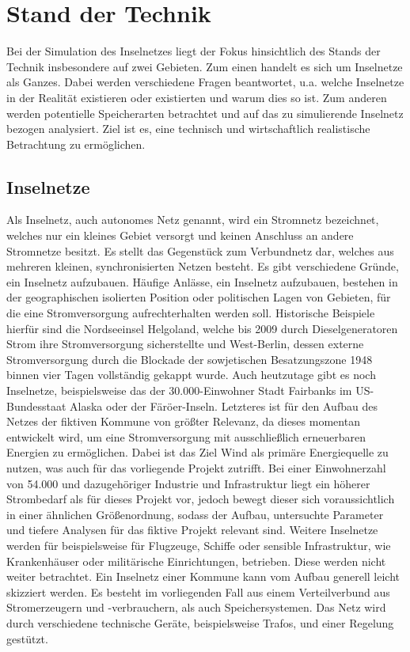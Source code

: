 \chapter{Stand der Technik}

Bei der Simulation des Inselnetzes liegt der Fokus hinsichtlich des Stands der Technik insbesondere auf zwei Gebieten. Zum einen handelt es sich um Inselnetze als Ganzes. Dabei werden verschiedene Fragen beantwortet, u.a. welche Inselnetze in der Realität existieren oder existierten und warum dies so ist. Zum anderen werden potentielle Speicherarten betrachtet und auf das zu simulierende Inselnetz bezogen analysiert. Ziel ist es, eine technisch und wirtschaftlich realistische Betrachtung zu ermöglichen.

\section{Inselnetze}

Als Inselnetz, auch autonomes Netz genannt, wird ein Stromnetz bezeichnet, welches nur ein kleines Gebiet versorgt und keinen Anschluss an andere Stromnetze besitzt. 
Es stellt das Gegenstück zum Verbundnetz dar, welches aus mehreren kleinen, synchronisierten Netzen besteht\cite{energielexikon}. 
Es gibt verschiedene Gründe, ein Inselnetz aufzubauen. Häufige Anlässe, ein Inselnetz aufzubauen, bestehen in der geographischen isolierten Position
oder politischen Lagen von Gebieten, für die eine Stromversorgung aufrechterhalten werden soll. 
Historische Beispiele hierfür sind die Nordseeinsel Helgoland, welche bis 2009 durch Dieselgeneratoren Strom ihre Stromversorgung sicherstellte\cite{merkur} und West-Berlin, 
dessen externe Stromversorgung durch die Blockade der sowjetischen Besatzungszone 1948 binnen vier Tagen vollständig gekappt wurde\cite{berlinstreet}. 
Auch heutzutage gibt es noch Inselnetze, beispielsweise das der 30.000-Einwohner Stadt Fairbanks im US-Bundesstaat Alaska\cite{iseralaska} oder 
der Färöer-Inseln\cite{cigre-article}. 
Letzteres ist für den Aufbau des Netzes der fiktiven Kommune von größter Relevanz, da dieses momentan entwickelt wird, 
um eine Stromversorgung mit ausschließlich erneuerbaren Energien zu ermöglichen\cite{trondheim-thesis}. 
Dabei ist das Ziel Wind als primäre Energiequelle zu nutzen, was auch für das vorliegende Projekt zutrifft. Bei einer Einwohnerzahl von 54.000\cite{statista-population} und dazugehöriger Industrie und Infrastruktur liegt ein höherer Strombedarf als für dieses Projekt vor, jedoch bewegt dieser sich voraussichtlich in einer ähnlichen Größenordnung, sodass der Aufbau, untersuchte Parameter und tiefere Analysen für das fiktive Projekt relevant sind.
Weitere Inselnetze werden für beispielsweise für Flugzeuge, Schiffe oder sensible Infrastruktur, wie Krankenhäuser oder militärische Einrichtungen, betrieben. 
Diese werden nicht weiter betrachtet.
Ein Inselnetz einer Kommune kann vom Aufbau generell leicht skizziert werden. 
Es besteht im vorliegenden Fall aus einem Verteilverbund  aus Stromerzeugern und -verbrauchern, als auch Speichersystemen. 
Das Netz wird durch verschiedene technische Geräte, beispielsweise Trafos, und einer Regelung gestützt. 

